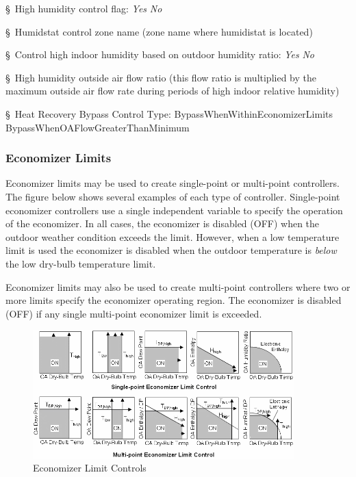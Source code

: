 §~High humidity control flag: \emph{Yes} \textbar{} \emph{No}

§~Humidstat control zone name (zone name where humidistat is located)

§~Control high indoor humidity based on outdoor humidity ratio: \emph{Yes} \textbar{} \emph{No}

§~High humidity outside air flow ratio (this flow ratio is multiplied by the maximum outside air flow rate during periods of high indoor relative humidity)

§~Heat Recovery Bypass Control Type: BypassWhenWithinEconomizerLimits \textbar{} BypassWhenOAFlowGreaterThanMinimum

\subsubsection{Economizer Limits}\label{economizer-limits}

Economizer limits may be used to create single-point or multi-point controllers. The figure below shows several examples of each type of controller. Single-point economizer controllers use a single independent variable to specify the operation of the economizer. In all cases, the economizer is disabled (OFF) when the outdoor weather condition exceeds the limit. However, when a low temperature limit is used the economizer is disabled when the outdoor temperature is \emph{below} the low dry-bulb temperature limit.

Economizer limits may also be used to create multi-point controllers where two or more limits specify the economizer operating region. The economizer is disabled (OFF) if any single multi-point economizer limit is exceeded.

\begin{figure}[hbtp] %
\centering
\includegraphics[width=0.9\textwidth, height=0.9\textheight, keepaspectratio=true]{media/image4411.png}
\caption{Economizer Limit Controls \protect \label{fig:economizer-limit-controls}}
\end{figure}

